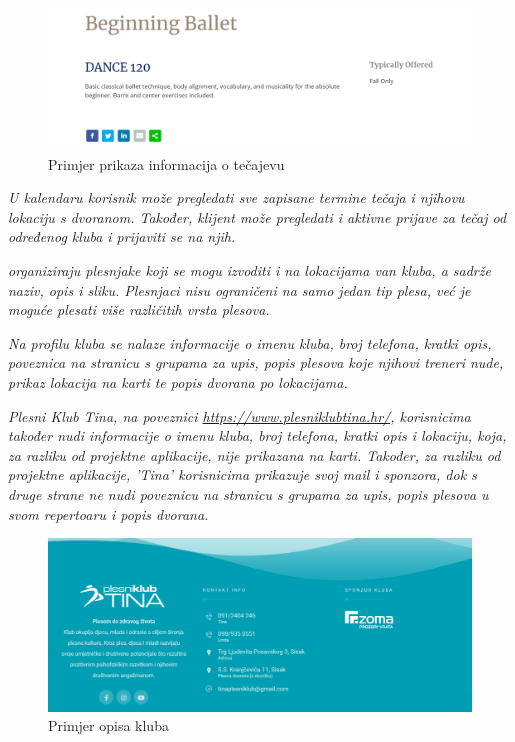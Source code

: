 \begin{figure}[H]
	\centering
	\includegraphics[scale=0.3]{slike/opis_2.png}
	\caption{Primjer prikaza informacija o tečajevu}
	\label{fig:screenshot002}
\end{figure}

\textit{ U kalendaru korisnik može pregledati sve zapisane termine tečaja i njihovu lokaciju s dvoranom. Također, klijent može pregledati i aktivne prijave za tečaj od određenog kluba i prijaviti se na njih.}

\textit{ organiziraju plesnjake koji se mogu izvoditi i na lokacijama van kluba, a sadrže naziv, opis i sliku. Plesnjaci nisu ograničeni na samo jedan tip plesa, već je moguće plesati više različitih vrsta plesova.}

\textit{Na profilu kluba se nalaze informacije o imenu kluba, broj telefona, kratki opis, poveznica na stranicu s grupama za upis, popis plesova koje njihovi treneri nude, prikaz lokacija na karti te popis dvorana po lokacijama.}

\textit{Plesni Klub Tina, na poveznici \url{https://www.plesniklubtina.hr/}, korisnicima također nudi informacije o imenu kluba, broj telefona, kratki opis i lokaciju, koja, za razliku od projektne aplikacije, nije prikazana na karti. Također, za razliku od projektne aplikacije, 'Tina' korisnicima prikazuje svoj mail i sponzora, dok s druge strane ne nudi poveznicu na stranicu s grupama za upis, popis plesova u svom repertoaru i popis dvorana.}

\begin{figure}[H]
	\centering
	\includegraphics[scale=0.2]{slike/opis_3.png}
	\caption{Primjer opisa kluba}
	\label{fig:screenshot003}
\end{figure}

